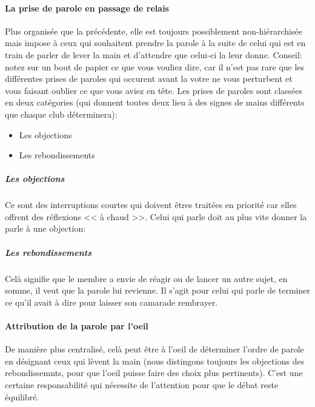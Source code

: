 \documentclass[a4paper,12pt]{article}
\begin{document}
\paragraph{La prise de parole en passage de relais}
Plus organisée que la précédente, elle est toujours possiblement non-hiérarchisée mais impose à ceux qui souhaitent prendre la parole à la suite de celui qui est en train de parler de lever la main et d'attendre que celui-ci la leur donne. Conseil: notez sur un bout de papier ce que vous vouliez dire, car il n'est pas rare que les différentes prises de paroles qui occurent avant la votre ne vous perturbent et vous faisant oublier ce que vous aviez en tête. Les prises de paroles sont classées en deux catégories (qui donnent toutes deux lieu à des signes de mains différents que chaque club déterminera):
\begin{itemize}
 \item Les objections
 \item Les rebondissements
\end{itemize}
\subparagraph{Les objections}
Ce sont des interruptions courtes qui doivent êtres traitées en priorité car elles offrent des réflexions << à chaud >>. Celui qui parle doit au plus vite donner la parle à une objection:
\subparagraph{Les rebondissements}
Celà signifie que le membre a envie de réagir ou de lancer un autre sujet, en somme, il veut que la parole lui revienne. Il s'agit pour celui qui parle de terminer ce qu'il avait à dire pour laisser son camarade rembrayer.
\paragraph{Attribution de la parole par l'oeil}
De manière plus centralisé, celà peut être à l'oeil de déterminer l'ordre de parole en désignant ceux qui lèvent la main (nous distingons toujours les objections des rebondissemnts, pour que l'oeil puisse faire des choix plus pertinents). C'est une certaine responsabilité qui nécessite de l'attention pour que le débat reste équilibré.
\end{document}
